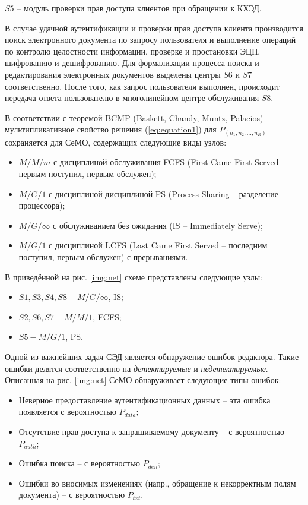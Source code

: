 \vspace{\baselineskip}
$S5$ -- \underline{модуль проверки прав доступа} клиентов при обращении к КХЭД.

\vspace{\baselineskip}
В случае удачной аутентификации и проверки прав доступа клиента производится поиск электронного документа по запросу пользователя и выполнение операций по контролю целостности информации, проверке и простановки ЭЦП, шифрованию и дешифрованию. Для формализации процесса поиска и редактирования электронных документов выделены центры $S6$ и $S7$ соответственно.
После того, как запрос пользователя выполнен, происходит передача ответа пользователю в многолинейном центре обслуживания $S8$.

\vspace{\baselineskip}
В соответствии с теоремой BCMP (Baskett, Chandy, Muntz, Palacios) мультипликативное свойство решения (\ref{eq:equation1}) для $P_(n_1,n_2,\ldots,n_R)$ сохраняется для СеМО, содержащих следующие виды узлов:
\begin{itemize}
  \item $M/M/m$ с дисциплиной обслуживания FCFS (First Came First Served -- первым поступил, первым обслужен);
  \item $M/G/1$ с дисциплиной дисциплиной PS (Process Sharing -- разделение процессора);
  \item $M/G/\infty$ с обслуживанием без ожидания (IS -- Immediately Serve);
  \item $M/G/1$ с дисциплиной LCFS (Last Came First Served -- последним поступил, первым обслужен) с прерываниями.\cite{bib7}
\end{itemize}

В приведённой на рис. \ref{img:net} схеме представлены следующие узлы:
\begin{itemize}
  \item $S1, S3, S4, S8 - M/G/\infty$, IS;
  \item $S2, S6, S7 - M/M/1$, FCFS;
  \item $S5 - M/G/1$, PS.\cite{bib3}
\end{itemize}

Одной из важнейших задач СЭД является обнаружение ошибок редактора. Такие ошибки делятся соответственно на \textit{детектируемые} и \textit{недетектируемые}.
Описанная на рис. \ref{img:net} СеМО обнаруживает следующие типы ошибок:
\begin{itemize}
  \item Неверное предоставление аутентификационных данных -- эта ошибка появляется с вероятностью $P_{data}$;
  \item Отсутствие прав доступа к запрашиваемому документу -- с вероятностью $P_{auth}$;
  \item Ошибка поиска -- с вероятностью $P_{den}$;
  \item Ошибки во вносимых изменениях (напр., обращение к некорректным полям документа) -- с вероятностью $P_{txt}$.
\end{itemize}

